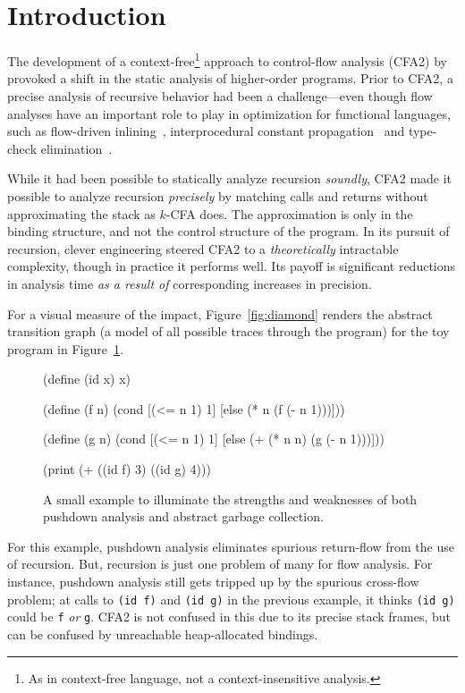 
\section{Introduction}

The development of a context-free\footnote{As in context-free language, not a context-insensitive analysis.
} approach to control-flow analysis
(CFA2) by \citet{mattmight:Vardoulakis:2010:CFA2} provoked a shift in the
static analysis of higher-order
programs.
Prior to CFA2, a precise analysis of recursive behavior 
had been a challenge---even though flow analyses have an important role to play in 
optimization for functional languages, such as 
flow-driven inlining~\cite{mattmight:Might:2006:DeltaCFA},
interprocedural constant propagation~\cite{mattmight:Shivers:1991:CFA}
and type-check elimination~\cite{mattmight:Wright:1998:Polymorphic}.


While it had been possible to statically analyze
recursion \emph{soundly}, CFA2 made it possible to analyze recursion
\emph{precisely} by matching calls and returns without approximating the stack as $k$-CFA does.
The approximation is only in the binding structure, and not the control structure of the program.
In its pursuit of recursion,
clever engineering steered CFA2 to a \emph{theoretically} intractable complexity, though in practice it performs well.
Its payoff is significant reductions in 
analysis time \emph{as a result of} corresponding increases
in precision.


For a visual measure of the impact, Figure~\ref{fig:diamond}
renders the abstract transition graph (a model of all possible traces through the program) for 
the toy program in Figure~\ref{fig:toy}.
\begin{figure}
\figrule
\begin{code}
(define (id x) x)

(define (f n)
  (cond [(<= n 1)  1]
        [else      (* n (f (- n 1)))]))

(define (g n)
  (cond [(<= n 1)  1]
        [else      (+ (* n n) (g (- n 1)))]))
    
(print (+ ((id f) 3) ((id g) 4)))
\end{code}
\caption{A small example to illuminate the strengths and weaknesses of
  both pushdown analysis and abstract garbage collection.}
\label{fig:toy}
\figrule
\end{figure}
For this example,
pushdown analysis
eliminates spurious return-flow from the
use of  recursion.
But, recursion is just one problem of many for flow analysis.
For instance, pushdown analysis still gets tripped up by
the
spurious cross-flow problem;
at calls to \texttt{(id f)}
and \texttt{(id g)} in the previous example,
it thinks \texttt{(id g)} could be \texttt{f} \emph{or} \texttt{g}.
CFA2 is not confused in this due to its precise stack frames, but can be confused by unreachable heap-allocated bindings.

